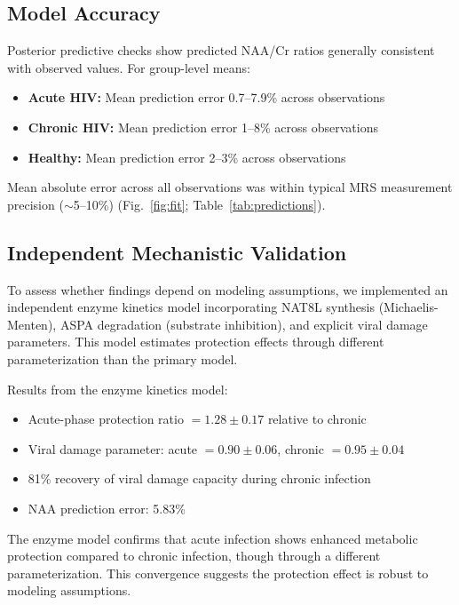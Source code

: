 \documentclass[10pt,a4paper]{article}
\begin{document}
\subsection{Model Accuracy}

Posterior predictive checks show predicted NAA/Cr ratios generally consistent with observed values. For group-level means:

\begin{itemize}
\item \textbf{Acute HIV:} Mean prediction error 0.7--7.9\% across observations
\item \textbf{Chronic HIV:} Mean prediction error 1--8\% across observations
\item \textbf{Healthy:} Mean prediction error 2--3\% across observations
\end{itemize}

Mean absolute error across all observations was within typical MRS measurement precision ($\sim$5--10\%) (Fig.~\ref{fig:fit}; Table~\ref{tab:predictions}).

\subsection{Independent Mechanistic Validation}

To assess whether findings depend on modeling assumptions, we implemented an independent enzyme kinetics model incorporating NAT8L synthesis (Michaelis-Menten), ASPA degradation (substrate inhibition), and explicit viral damage parameters. This model estimates protection effects through different parameterization than the primary model.

Results from the enzyme kinetics model:
\begin{itemize}
\item Acute-phase protection ratio $= 1.28 \pm 0.17$ relative to chronic
\item Viral damage parameter: acute $= 0.90 \pm 0.06$, chronic $= 0.95 \pm 0.04$
\item 81\% recovery of viral damage capacity during chronic infection
\item NAA prediction error: 5.83\%
\end{itemize}

The enzyme model confirms that acute infection shows enhanced metabolic protection compared to chronic infection, though through a different parameterization. This convergence suggests the protection effect is robust to modeling assumptions.
\end{document}

